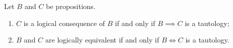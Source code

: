 \begin{node}\label{prop-0007}%
Let $B$ and $C$ be propositions.
\begin{enumerate}
\item $C$ is a logical consequence of $B$ if and only if $B\implies C$
  is a tautology;
\item $B$ and $C$ are logically equivalent if and only if $B\iff C$ is a tautology.
\end{enumerate}
\end{node}
